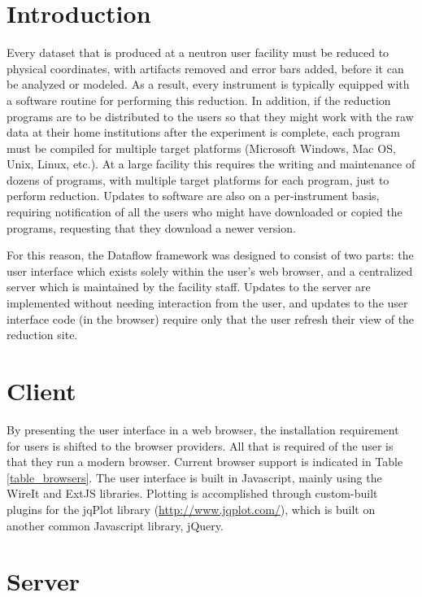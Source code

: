 \documentclass[pdf]{iucr}           %
\begin{document}
\section{Introduction}

Every dataset that is produced at a neutron user facility must be reduced to physical coordinates,
with artifacts removed and error bars added, before it can be analyzed or modeled.
As a result, every instrument is typically equipped with a software routine for performing this 
reduction.  In addition, if the reduction programs are to be distributed to the users so that
they might work with the raw data at their home institutions after the experiment is complete,
each program must be compiled for multiple target platforms 
(Microsoft Windows, Mac OS, Unix, Linux, etc.).  
At a large facility this requires the writing and maintenance of dozens of programs, with multiple
target platforms for each program, just to perform reduction.
Updates to software are also on a per-instrument basis, requiring
notification of all the users who might have downloaded or copied the programs, requesting that they 
download a newer version.

For this reason, the Dataflow framework was designed to consist of two parts: 
the user interface which exists solely within the user's web browser, and a centralized server which
is maintained by the facility staff.  Updates to the server are implemented without needing
interaction from the user, and updates to the user interface code (in the browser) require only that 
the user refresh their view of the reduction site.
 

\section{Client}

By presenting the user interface in a web browser, the installation requirement for users is shifted to the
browser providers.  All that is required of the user is that they run a modern browser.
Current browser support is indicated in Table \ref{table_browsers}.
The user interface is built in Javascript, mainly using the WireIt and ExtJS libraries.
Plotting is accomplished through custom-built plugins for the jqPlot library 
(\url{http://www.jqplot.com/}), which is built on another common Javascript library, jQuery.




\section{Server}
\end{document}
